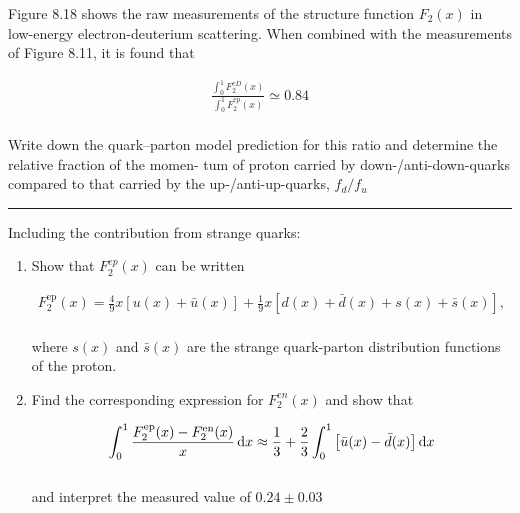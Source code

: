 \begin{problem}{8.6}
Figure 8.18 shows the raw measurements of the structure function $F_2(x)$ in low-energy electron-deuterium scattering. When combined with the measurements of Figure 8.11, it is found that

\begin{align*}
    \frac{\int_0^1 F^{eD}_2(x)}{\int_0^1 F^{ep}_2(x)} \simeq 0.84
\end{align*}\\
Write down the quark–parton model prediction for this ratio and determine the relative fraction of the momen- tum of proton carried by down-/anti-down-quarks compared to that carried by the up-/anti-up-quarks, $f_d/f_u$
\end{problem}
\begin{solution}

\end{solution}

\noindent\rule{7in}{1.5pt}


\begin{problem}{8.7}
    Including the contribution from strange quarks:

    \begin{enumerate}[label=(\alph*)]
        \item Show that $F_2^{ep}(x)$ can be written 
        
        \begin{align*}
            F_2^{\text{ep}}(x) = \frac{4}{9} x \left[ u(x) + \bar{u}(x) \right] + \frac{1}{9} x \left[ d(x) + \bar{d}(x) + s(x) + \bar{s}(x) \right],
        \end{align*}\\
        where $s(x)$ and $\bar{s}(x)$ are the strange quark-parton distribution functions of the proton.
        \item Find the corresponding expression for $F_2^{en}(x)$ and show that
        
        \begin{align*}
            \int_0^1 \frac{F^{\text{ep}}_2(x)-F^{\text{en}}_2(x)}{x} \mathop{}\!\mathrm{d} x \approx \frac{1}{3} + \frac{2}{3} \int_0^1 \left[ \bar{u}(x) - \bar{d}(x) \right] \mathop{}\!\mathrm{d} x
        \end{align*}\\
        and interpret the measured value of $0.24\pm 0.03$
    \end{enumerate}
\end{problem}
\begin{solution}

\end{solution}


